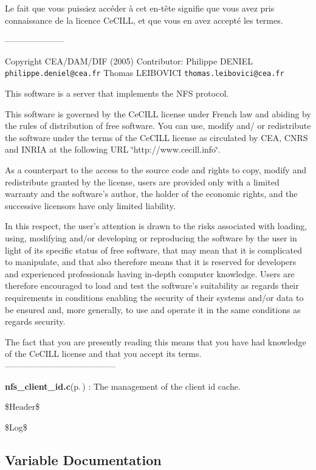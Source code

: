 Le fait que vous puissiez acc\'{e}der \`{a} cet en-t\^{e}te signifie que vous avez pris connaissance de la licence Ce\-CILL, et que vous en avez accept\'{e} les termes.

---------------------

Copyright CEA/DAM/DIF (2005) Contributor: Philippe DENIEL {\tt philippe.deniel@cea.fr} Thomas LEIBOVICI {\tt thomas.leibovici@cea.fr}

This software is a server that implements the NFS protocol.

This software is governed by the Ce\-CILL license under French law and abiding by the rules of distribution of free software. You can use, modify and/ or redistribute the software under the terms of the Ce\-CILL license as circulated by CEA, CNRS and INRIA at the following URL \char`\"{}http://www.cecill.info\char`\"{}.

As a counterpart to the access to the source code and rights to copy, modify and redistribute granted by the license, users are provided only with a limited warranty and the software's author, the holder of the economic rights, and the successive licensors have only limited liability.

In this respect, the user's attention is drawn to the risks associated with loading, using, modifying and/or developing or reproducing the software by the user in light of its specific status of free software, that may mean that it is complicated to manipulate, and that also therefore means that it is reserved for developers and experienced professionals having in-depth computer knowledge. Users are therefore encouraged to load and test the software's suitability as regards their requirements in conditions enabling the security of their systems and/or data to be ensured and, more generally, to use and operate it in the same conditions as regards security.

The fact that you are presently reading this means that you have had knowledge of the Ce\-CILL license and that you accept its terms. ---------------------------------------

{\bf nfs\_\-client\_\-id.c}{\rm (p.\,\pageref{nfs__client__id_8c})} : The management of the client id cache.

\$Header\$

\$Log\$ 

\subsection{Variable Documentation}
